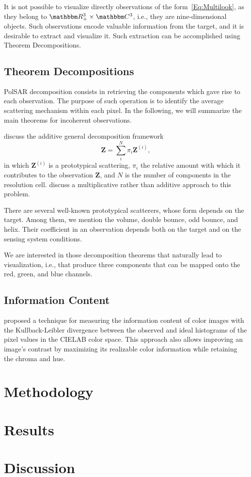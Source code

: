 \documentclass[12pt]{article}
\begin{document}
It is not possible to visualize directly observations of the form~\eqref{Eq:Multilook}, as they belong to $\mathbbm R_+^3\times \mathbbm C^3$, i.e., they are nine-dimensional objects.
Such observations encode valuable information from the target, and it is desirable to extract and visualize it.
Such extraction can be accomplished using Theorem Decompositions.

\subsection{Theorem Decompositions}

PolSAR decomposition consists in retrieving the components which gave rise to each observation.
The purpose of such operation is to identify the average scattering mechanism within each pixel.
In the following, we will summarize the main theorems for incoherent observations.

\citet{ModelingandInterpretationofScatteringMechanismsinPolarimetricSyntheticApertureRadarAdvancesandPerspectives2014} discuss the additive general decomposition framework
\begin{equation}
\bm Z = \sum_i^N \pi_i \bm Z^{(i)},
\end{equation}
in which $\bm Z^{(i)}$ is a prototypical scattering, 
$\pi_i$ the relative amount with which it contributes to the observation $\bm Z$, and $N$ is the number of components in the resolution cell.
\citet{APolSARScatteringPowerFactorizationFrameworkandNovelRollInvariantParametersBasedUnsupervisedClassificationSchemeUsingaGeodesicDistanceinpress} discuss a multiplicative rather than additive approach to this problem.

There are several well-known prototypical scatterers, whose form depends on the target.
Among them, we mention the volume, double bounce, odd bounce, and helix.
Their coefficient in an observation depends both on the target and on the sensing system conditions.

We are interested in those decomposition theorems that naturally lead to visualization, i.e., that produce three components that can be mapped onto the red, green, and blue channels.

\subsection{Information Content}

\citet{AssessingInformationContentinColorImages} proposed a technique for measuring the information content of color images with the Kullback-Leibler divergence between the observed and ideal histograms of the pixel values in the CIELAB color space.
This approach also allows improving an image's contrast by maximizing its realizable color information while retaining the chroma and hue.




\section{Methodology}


\section{Results}

\section{Discussion}



\end{document}
